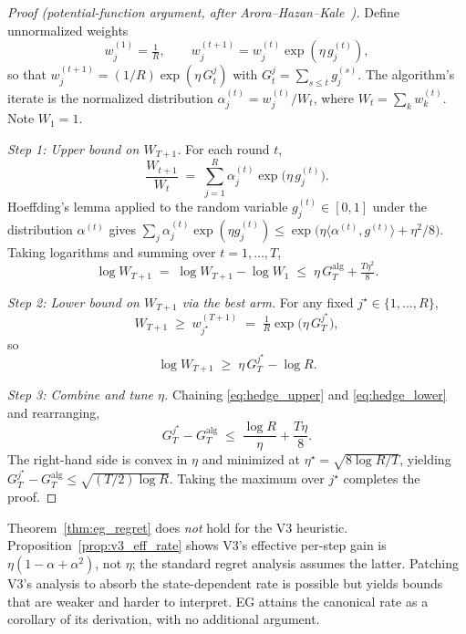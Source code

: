 \documentclass[11pt,a4paper]{article}
\theoremstyle{definition}
\theoremstyle{plain}
\begin{document}
\begin{proof}[Proof (potential-function argument, after Arora--Hazan--Kale~\cite{arora2012multiplicative})]
Define unnormalized weights
\[
w_j^{(1)} = \tfrac{1}{R}, \qquad
w_j^{(t+1)} = w_j^{(t)} \exp\!\left(\eta\, g_j^{(t)}\right),
\]
so that $w_j^{(t+1)} = (1/R)\exp(\eta\, G_t^j)$ with
$G_t^j = \sum_{s \leq t} g_j^{(s)}$. The algorithm's iterate is the
normalized distribution $\alpha_j^{(t)} = w_j^{(t)} / W_t$, where
$W_t = \sum_{k} w_k^{(t)}$. Note $W_1 = 1$.

\emph{Step 1: Upper bound on $W_{T+1}$.} For each round $t$,
\[
\frac{W_{t+1}}{W_t}
\;=\; \sum_{j=1}^{R} \alpha_j^{(t)} \exp\!\bigl(\eta\, g_j^{(t)}\bigr).
\]
Hoeffding's lemma applied to the random variable $g_j^{(t)} \in [0,1]$
under the distribution $\alpha^{(t)}$ gives
$\sum_j \alpha_j^{(t)} \exp(\eta g_j^{(t)})
\leq \exp\!\bigl(\eta \langle \alpha^{(t)}, g^{(t)}\rangle + \eta^2/8\bigr)$.
Taking logarithms and summing over $t = 1, \ldots, T$,
\begin{equation}
\label{eq:hedge_upper}
\log W_{T+1}
\;=\; \log W_{T+1} - \log W_1
\;\leq\; \eta\, G_T^{\mathrm{alg}} + \tfrac{T\eta^2}{8}.
\end{equation}

\emph{Step 2: Lower bound on $W_{T+1}$ via the best arm.} For any fixed
$j^\star \in \{1, \ldots, R\}$,
\[
W_{T+1} \;\geq\; w_{j^\star}^{(T+1)}
\;=\; \tfrac{1}{R}\exp\!\bigl(\eta\, G_T^{j^\star}\bigr),
\]
so
\begin{equation}
\label{eq:hedge_lower}
\log W_{T+1}
\;\geq\; \eta\, G_T^{j^\star} - \log R.
\end{equation}

\emph{Step 3: Combine and tune $\eta$.} Chaining
\eqref{eq:hedge_upper} and \eqref{eq:hedge_lower} and rearranging,
\[
G_T^{j^\star} - G_T^{\mathrm{alg}}
\;\leq\; \frac{\log R}{\eta} + \frac{T\eta}{8}.
\]
The right-hand side is convex in $\eta$ and minimized at
$\eta^\star = \sqrt{8\log R / T}$, yielding
$G_T^{j^\star} - G_T^{\mathrm{alg}} \leq \sqrt{(T/2)\log R}$.
Taking the maximum over $j^\star$ completes the proof.
\end{proof}

\noindent Theorem~\ref{thm:eg_regret} does \emph{not} hold for the V3
heuristic. Proposition~\ref{prop:v3_eff_rate} shows V3's effective
per-step gain is $\eta(1 - \alpha + \alpha^2)$, not $\eta$; the standard
regret analysis assumes the latter. Patching V3's analysis to absorb
the state-dependent rate is possible but yields bounds that are weaker
and harder to interpret. EG attains the canonical rate as a corollary
of its derivation, with no additional argument.
\end{document}
